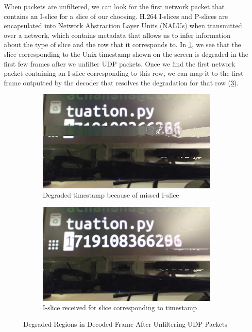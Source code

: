 When packets are unfiltered, we can look for the first network packet that
contains an I-slice for a slice of our choosing. H.264 I-slices and P-slices
are encapsulated into Network Abstraction Layer Units (NALUs) when transmitted
over a network, which contains metadata that allows us to infer information
about the type of slice and the row that it corresponds to. In
\cref{fig:garbled-ts-1}, we see that the slice corresponding to the Unix
timestamp shown on the screen is degraded in the first few frames after we
unfilter UDP packets. Once we find the first network packet containing an
I-slice corresponding to this row, we can map it to the first frame outputted
by the decoder that resolves the degradation for that row
(\cref{fig:garbled-ts-2}).

\begin{figure}[htbp]
    \centering
    \begin{subfigure}[t]{0.45\textwidth}
        \centering
        \includegraphics[width = \textwidth]{figs/garbled-ts-1.jpg}
        \caption{Degraded timestamp because of missed I-slice}
        \label{fig:garbled-ts-1}
    \end{subfigure}
    \hfill
    \begin{subfigure}[t]{0.45\textwidth}
        \centering
        \includegraphics[width = \textwidth]{figs/garbel-ts-2.jpg}
        \caption{I-slice received for slice corresponding to timestamp}
        \label{fig:garbled-ts-2}
    \end{subfigure}
    \caption{Degraded Regions in Decoded Frame After Unfiltering UDP Packets}
\end{figure}


